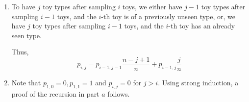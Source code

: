 \begin{enumerate}[label=(\alph*)]
\item To have $j$ toy types after sampling $i$ toys, we either have $j-1$ toy types after sampling $i-1$ toys, and the $i$-th toy is of a previously unseen type, or, we have $j$ toy types after sampling $i-1$ toys, and the $i$-th toy has an already seen type.

Thus, $$p_{i,j} = p_{i-1,j-1} \frac{n-j+1}{n} + p_{i-1,j} \frac{j}{n}$$

\item Note that $p_{1,0} = 0, p_{1, 1} = 1$ and $p_{i, j} = 0$ for $j > i$. Using strong induction, a proof of the recursion in part $a$ follows.
\end{enumerate}
